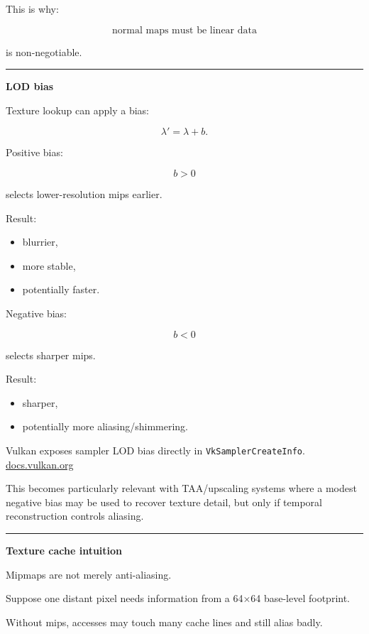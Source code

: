 This is why:

\[
\boxed{\text{normal maps must be linear data}}
\]

is non-negotiable.

\begin{center}\rule{0.5\linewidth}{0.5pt}\end{center}

\textbf{LOD bias}

Texture lookup can apply a bias:

\[
\lambda'=\lambda+b.
\]

Positive bias:

\[
b>0
\]

selects lower-resolution mips earlier.

Result:

\begin{itemize}
\tightlist
\item
  blurrier,
\item
  more stable,
\item
  potentially faster.
\end{itemize}

Negative bias:

\[
b<0
\]

selects sharper mips.

Result:

\begin{itemize}
\tightlist
\item
  sharper,
\item
  potentially more aliasing/shimmering.
\end{itemize}

Vulkan exposes sampler LOD bias directly in \texttt{VkSamplerCreateInfo}. \href{https://docs.vulkan.org/spec/latest/chapters/samplers.html?utm_source=chatgpt.com}{docs.vulkan.org}

This becomes particularly relevant with TAA/upscaling systems where a modest negative bias may be used to recover texture detail, but only if temporal reconstruction controls aliasing.

\begin{center}\rule{0.5\linewidth}{0.5pt}\end{center}

\textbf{Texture cache intuition}

Mipmaps are not merely anti-aliasing.

Suppose one distant pixel needs information from a 64×64 base-level footprint.

Without mips, accesses may touch many cache lines and still alias badly.

